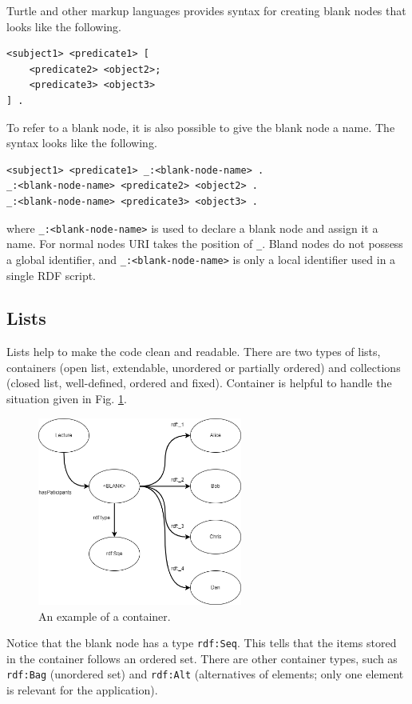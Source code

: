 Turtle and other markup languages provides syntax for creating blank nodes that looks like the following.
\begin{lstlisting}
<subject1> <predicate1> [
	<predicate2> <object2>;
	<predicate3> <object3>
] .
\end{lstlisting}
To refer to a blank node, it is also possible to give the blank node a name. The syntax looks like the following.
\begin{lstlisting}
<subject1> <predicate1> _:<blank-node-name> .
_:<blank-node-name> <predicate2> <object2> .
_:<blank-node-name> <predicate3> <object3> .
\end{lstlisting}
where \verb|_:<blank-node-name>| is used to declare a blank node and assign it a name. For normal nodes URI takes the position of \verb|_|. Bland nodes do not possess a global identifier, and \verb|_:<blank-node-name>| is only a local identifier used in a single RDF script.

\subsection{Lists}

Lists help to make the code clean and readable. There are two types of lists, containers (open list, extendable, unordered or partially ordered) and collections (closed list, well-defined, ordered and fixed). Container is helpful to handle the situation given in Fig.  \ref{fig:lectureexp3}.
\begin{figure}[!htb]
	\centering
	\includegraphics[width=0.6\textwidth]{chapters/part-4/figures/lectureexp3.png}
	\caption{An example of a container.}
	\label{fig:lectureexp3}
\end{figure}
Notice that the blank node has a type \verb|rdf:Seq|. This tells that the items stored in the container follows an ordered set. There are other container types, such as \verb|rdf:Bag| (unordered set) and \verb|rdf:Alt| (alternatives of elements; only one element is relevant for the application).


